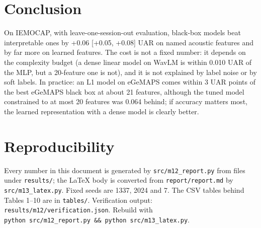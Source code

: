 \documentclass[11pt]{article}
\begin{document}
\section{Conclusion}\label{conclusion}

On IEMOCAP, with leave-one-session-out evaluation, black-box models beat interpretable ones by +0.06 {[}+0.05, +0.08{]} UAR on named acoustic features and by far more on learned features. The cost is not a fixed number: it depends on the complexity budget (a dense linear model on WavLM is within 0.010 UAR of the MLP, but a 20-feature one is not), and it is not explained by label noise or by soft labels. In practice: an L1 model on eGeMAPS comes within 3 UAR points of the best eGeMAPS black box at about 21 features, although the tuned model constrained to at most 20 features was 0.064 behind; if accuracy matters most, the learned representation with a dense model is clearly better.

\clearpage
\appendix

\section{Reproducibility}
Every number in this document is generated by \texttt{src/m12\_report.py} from files under \texttt{results/}; the LaTeX body is converted from \texttt{report/report.md} by \texttt{src/m13\_latex.py}. Fixed seeds are 1337, 2024 and 7. The CSV tables behind Tables 1--10 are in \texttt{tables/}. Verification output: \texttt{results/m12/verification.json}. Rebuild with \texttt{python\ src/m12\_report.py\ \&\&\ python\ src/m13\_latex.py}.
\end{document}
